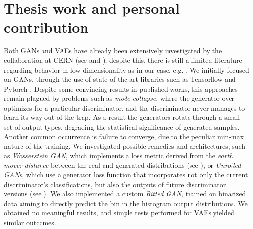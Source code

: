 \documentclass{scrartcl} %
\begin{document}
	\section*{Thesis work and personal contribution}
	
	Both GANs and VAEs have already been extensively investigated by the collaboration at CERN (see \cite{2019glhc} and \cite{otten2021event}); despite this, there is still a limited literature regarding behavior in low dimensionality as in our case, e.g. \cite{523096}. We initially focused on GANs, through the use of state of the art libraries such as Tensorflow \cite{tensorflow2015-whitepaper} and Pytorch \cite{NEURIPS2019_9015}. Despite some convincing results in published works, this approaches remain plagued by problems such as \emph{mode collapse}, where the generator over-optimizes for a particular discriminator, and the discriminator never manages to learn its way out of the trap. As a result the generators rotate through a small set of output types, degrading the statistical significance of generated samples. Another common occurrence is failure to converge, due to the peculiar min-max nature of the training.
	We investigated possible remedies and architectures, such as \emph{Wasserstein GAN}, which implements a loss metric derived from the \emph{earth mover distance} between the real and generated distributions (see \cite{arjovsky2017wasserstein}), or \emph{Unrolled GAN}s, which use a generator loss function that incorporates not only the current discriminator's classifications, but also the outputs of future discriminator versions (see \cite{metz2017unrolled}). We also implemented a custom \emph{Bitted GAN}, trained on binarized data aiming to directly predict the bin in the histogram output distributions.
	We obtained no meaningful results, and simple tests performed for VAEs yielded similar outcomes.
	
\end{document}
